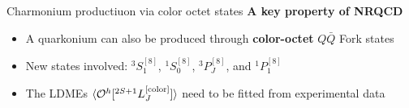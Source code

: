\documentclass[aspectratio=169]{beamer}
\begin{document}
\begin{frame}{Charmonium productiuon via color octet states}
	\hspace{3mm}\textcolor{PittRoyal}{\bf A key property of NRQCD}\\
	\begin{itemize}
		\item A quarkonium can also be produced through {\bf color-octet} $Q{\bar Q}$ Fork states
		\item New states involved: $^3S_1^{[8]}$, $^1S_0^{[8]}$, $^3P_J^{[8]}$, and $^1P_1^{[8]}$
		\item The LDMEs $\langle {\cal O}^h[^{2S+1}L_J^{\rm [color]}] \rangle$ need to be fitted from experimental data
	\end{itemize}

	\begin{table}[htb]
	\end{table}


\end{frame}
\end{document}
